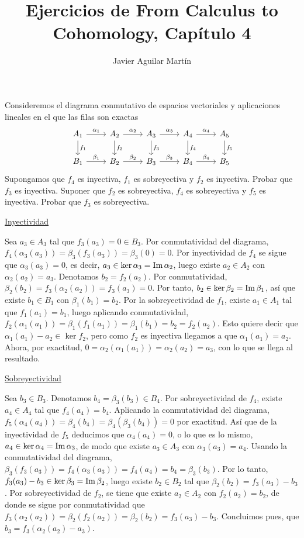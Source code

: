 \documentclass[twoside]{article}
\begin{document}
\title{Ejercicios de From Calculus to Cohomology, Capítulo 4}
\author{Javier Aguilar Martín}
\maketitle


\begin{ejercicio}{4.1}
Consideremos el diagrama conmutativo de espacios vectoriales y aplicaciones lineales en el que las filas son exactas
\[
\begin{tikzcd}
A_1\arrow[d,"f_1"]\arrow[r, "\alpha_1"] & A_2\arrow[d,"f_2"]\arrow[r, "\alpha_2"] & A_3\arrow[d,"f_3"]\arrow[r, "\alpha_3"] & A_4\arrow[d,"f_4"]\arrow[r, "\alpha_4"] & A_5\arrow[d,"f_5"]\\
B_1\arrow[r, "\beta_1"] & B_2\arrow[r, "\beta_2"] & B_3\arrow[r, "\beta_3"] & B_4\arrow[r, "\beta_4"] & B_5
\end{tikzcd}
\]
Supongamos que $f_4$ es inyectiva, $f_1$ es sobreyectiva y $f_2$ es inyectiva. Probar que $f_3$ es inyectiva. Suponer que $f_2$ es sobreyectiva, $f_4$ es sobreyectiva y $f_5$ es inyectiva. Probar que $f_3$ es sobreyectiva. 
\end{ejercicio}
\begin{solucion}
\underline{Inyectividad}

Sea $a_3\in A_3$ tal que $f_3(a_3)=0\in B_3$. Por conmutatividad del diagrama, $f_4(\alpha_3(a_3))=\beta_3(f_3(a_3))=\beta_3(0)=0$. Por inyectividad de $f_4$ se sigue que $\alpha_3(a_3)=0$, es decir, $a_3\in\ker{\alpha_3}=\operatorname{Im}{\alpha_2}$, luego existe $a_2\in A_2$ con $\alpha_2(a_2)=a_3$. Denotamos $b_2=f_2(a_2)$. Por conmutatividad, $\beta_2(b_2)=f_3(\alpha_2(a_2))=f_3(a_3)=0$. Por tanto, $b_2\in\ker{\beta_2}=\operatorname{Im}{\beta_1}$, así que existe $b_1\in B_1$ con $\beta_1(b_1)=b_2$. Por la sobreyectividad de $f_1$, existe $a_1\in A_1$ tal que $f_1(a_1)=b_1$, luego aplicando conmutatividad, $f_2(\alpha_1(a_1))=\beta_1(f_1(a_1))=\beta_1(b_1)=b_2=f_2(a_2)$. Esto quiere decir que $\alpha_1(a_1)-a_2\in\ker{f_2}$, pero como $f_2$ es inyectiva llegamos a que $\alpha_1(a_1)=a_2$. Ahora, por exactitud, $0=\alpha_2(\alpha_1(a_1))=\alpha_2(a_2)=a_3$, con lo que se llega al resultado.

\underline{Sobreyectividad}

Sea $b_3\in B_3$. Denotamos $b_4=\beta_3(b_3)\in B_4$. Por sobreyectividad de $f_4$, existe $a_4\in A_4$ tal que $f_4(a_4)=b_4$. Aplicando la conmutatividad del diagrama, $f_5(\alpha_4(a_4))=\beta_4(b_4)=\beta_4(\beta_3(b_4))=0$ por exactitud. Así que de la inyectividad de $f_5$ deducimos que $\alpha_4(a_4)=0$, o lo que es lo mismo, $a_4\in\ker{\alpha_4}=\operatorname{Im}{\alpha_3}$, de modo que existe $a_3\in A_3$ con $\alpha_3(a_3)=a_4$. Usando la conmutatividad del diagrama, $\beta_3(f_3(a_3))=f_4(\alpha_3(a_3))=f_4(a_4)=b_4=\beta_3(b_3)$. Por lo tanto, $f_3(a_3)-b_3\in\ker{\beta_3}=\operatorname{Im}{\beta_2}$, luego existe $b_2\in B_2$ tal que $\beta_2(b_2)=f_3(a_3)-b_3$. Por sobreyectividad de $f_2$, se tiene que existe $a_2\in A_2$ con $f_2(a_2)=b_2$, de donde se sigue por conmutatividad que $f_3(\alpha_2(a_2))=\beta_2(f_2(a_2))=\beta_2(b_2)=f_3(a_3)-b_3$. Concluimos pues, que $b_3=f_3(\alpha_2(a_2)-a_3)$.
\end{solucion}
\end{document}
